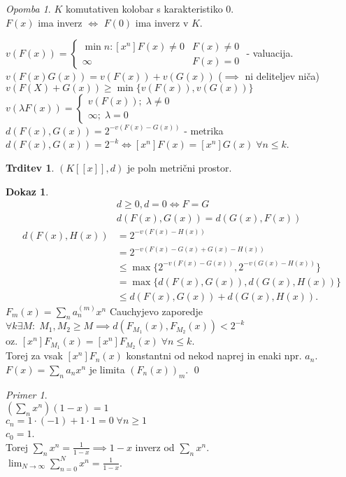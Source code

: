 \documentclass[a4paper, 12pt]{book}
\theoremstyle{definition}
\newtheorem{claim}[counter]{Trditev}
\newtheorem{pro}[counter]{Dokaz}
\theoremstyle{remark}
\newtheorem*{ex}{Primer}
\newtheorem*{rem}{Opomba}
\begin{document}
\begin{rem}
  $K$ komutativen kolobar s karakteristiko $0$. \\
  $F(x)$ ima inverz $\iff$ $F(0)$ ima inverz v $K$.
\end{rem}
$v(F(x)) = \begin{cases}
  \min n: [x^n]F(x) \neq 0 &F(x) \neq 0 \\
  \infty &F(x) = 0
\end{cases}$ - valuacija. \\
$v(F(x) G(x)) = v(F(x)) + v(G(x))$ ($\implies$ ni deliteljev niča) \\
$v(F(X) + G(x)) \geq \min \{v(F(x)), v(G(x))\}$ \\
$v(\lambda F(x)) = \begin{cases}
  v(F(x)); \; \lambda \neq 0 \\
  \infty; \; \lambda = 0
\end{cases}$ \\
$d(F(x), G(x)) = 2^{-v(F(x) - G(x))}$ - metrika \\
$d(F(x), G(x)) = 2^{-k} \iff [x^n] F(x) = [x^n] G(x) \; \forall n \leq k$.
\begin{claim}
  $(K[[x]], d)$ je poln metrični prostor.
\end{claim}
\begin{pro}
  \begin{align*}
    &d \geq 0, d = 0 \iff F = G \\
    &d(F(x), G(x)) = d(G(x), F(x)) \\
    d(F(x), H(x)) &= 2^{-v(F(x) - H(x))} \\
    &= 2^{-v(F(x) - G(x) + G(x) - H(x))} \\
    &\leq \max \{2^{-v(F(x) - G(x))}, 2^{-v(G(x) - H(x))}\} \\
    &= \max \{d(F(x), G(x)), d(G(x), H(x))\} \\
    &\leq d(F(x), G(x)) + d(G(x), H(x)).
  \end{align*}
  $F_m(x) = \sum_n a_n^{(m)} x^n$ Cauchyjevo zaporedje \\
  $\forall k \exists M: \; M_1, M_2 \geq M \implies d(F_{M_1}(x), F_{M_2}(x)) < 2^{-k}$ \\
  oz. $[x^n] F_{M_1} (x) = [x^n] F_{M_2} (x) \; \forall n \leq k$. \\
  Torej za vsak $[x^n] F_n(x)$ konstantni od nekod naprej in enaki npr. $a_n$. \\
  $F(x) = \sum_n a_n x^n$ je limita $(F_n(x))_m$.
  \qed
\end{pro}
\begin{ex} \text{} \\
  $\left(\sum_n x^n\right) (1-x) = 1$ \\
  $c_n = 1 \cdot (-1) + 1 \cdot 1 = 0 \; \forall n \geq 1$ \\
  $c_0 = 1$. \\
  Torej $\sum_n x^n = \frac{1}{1-x} \implies 1-x$ inverz od $\sum_n x^n$. \\
  $\lim_{N \to \infty} \sum_{n=0}^{N} x^n = \frac{1}{1-x}$. \\
\end{ex}
\end{document}
